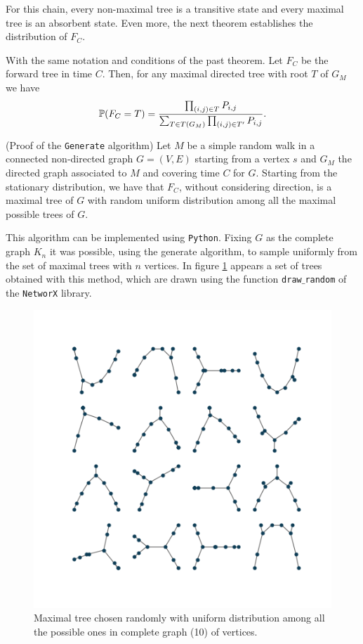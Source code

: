 For this chain, every non-maximal tree is a transitive state and every maximal tree is an absorbent state. Even more, the next theorem establishes the distribution of  $F_{C}$.

\begin{theorem}
With the same notation and conditions of the past theorem. Let $F_{C}$ be the forward tree in time $C$. Then, for any maximal directed tree with root $T$ of $G_{M}$ we have
$$\P(F_{C} = T) = \frac{\prod_{(i,j)\in T} P_{i,j}}{\sum_{T\in T(G_{M})} \prod_{(i,j)\in T'} P_{i,j}}.$$
\end{theorem}

\begin{coro}
(Proof of the \texttt{Generate} algorithm) Let $M$ be a simple random walk in a connected non-directed graph $G = (V, E)$ starting from a vertex $s$ and $G_{M}$ the directed graph associated to $M$ and covering time $C$ for $G$. Starting from the stationary distribution, we have that $F_{C}$, without considering direction, is a maximal tree of $G$ with random uniform distribution among all the maximal possible trees of $G$.
\end{coro}

This algorithm can be implemented using \texttt{Python}. Fixing $G$ as the complete graph $K_{n}$ it was possible, using the generate algorithm, to sample uniformly from the set of maximal trees with $n$ vertices. In figure \ref{fig:RandromTrees} appears a set of trees obtained with this method, which are drawn using the function \texttt{draw$\_$random} of the \texttt{NetworX} library.

\begin{figure}[h!]
	\centering
	\includegraphics[scale=0.8]{Python/Figures/Tree-sample10.png}
	\caption{Maximal tree chosen randomly with uniform distribution among all the possible ones in complete graph (10) of vertices.}
	\label{fig:RandromTrees}
\end{figure}

